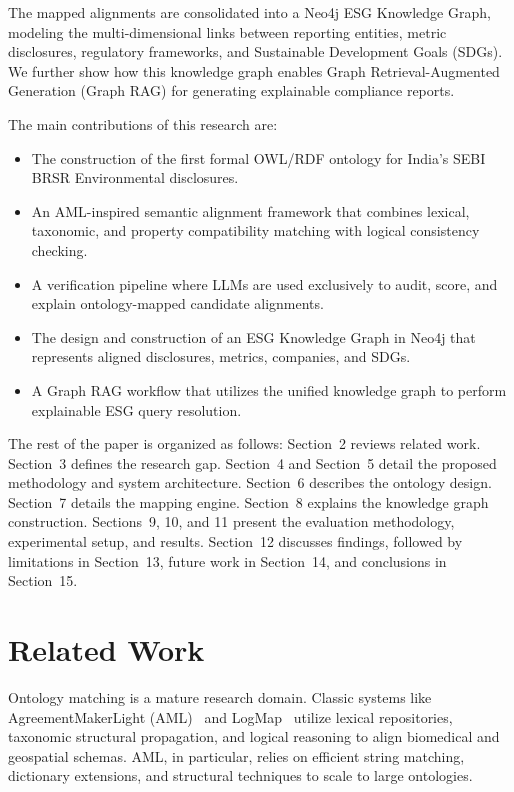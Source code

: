\documentclass[journal,compsoc]{IEEEtran}
\begin{document}
\begin{itemize}
\begin{table}[t]
\begin{itemize}
The mapped alignments are consolidated into a Neo4j ESG Knowledge Graph, modeling the multi-dimensional links between reporting entities, metric disclosures, regulatory frameworks, and Sustainable Development Goals (SDGs). We further show how this knowledge graph enables Graph Retrieval-Augmented Generation (Graph RAG) for generating explainable compliance reports.

The main contributions of this research are:
\begin{itemize}
    \item The construction of the first formal OWL/RDF ontology for India's SEBI BRSR Environmental disclosures.
    \item An AML-inspired semantic alignment framework that combines lexical, taxonomic, and property compatibility matching with logical consistency checking.
    \item A verification pipeline where LLMs are used exclusively to audit, score, and explain ontology-mapped candidate alignments.
    \item The design and construction of an ESG Knowledge Graph in Neo4j that represents aligned disclosures, metrics, companies, and SDGs.
    \item A Graph RAG workflow that utilizes the unified knowledge graph to perform explainable ESG query resolution.
\end{itemize}

The rest of the paper is organized as follows: Section~2 reviews related work. Section~3 defines the research gap. Section~4 and Section~5 detail the proposed methodology and system architecture. Section~6 describes the ontology design. Section~7 details the mapping engine. Section~8 explains the knowledge graph construction. Sections~9, 10, and 11 present the evaluation methodology, experimental setup, and results. Section~12 discusses findings, followed by limitations in Section~13, future work in Section~14, and conclusions in Section~15.

\section{Related Work}
Ontology matching is a mature research domain. Classic systems like AgreementMakerLight (AML)~\cite{aml2013} and LogMap~\cite{logmap2011} utilize lexical repositories, taxonomic structural propagation, and logical reasoning to align biomedical and geospatial schemas. AML, in particular, relies on efficient string matching, dictionary extensions, and structural techniques to scale to large ontologies.


\end{itemize}
\end{table}
\end{itemize}
\end{document}
